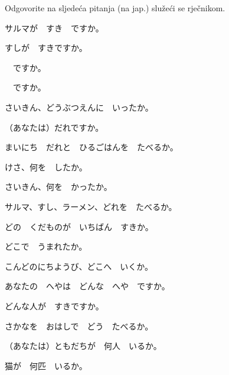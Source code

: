 
\author{Tomislav Mamić}

	
	\begin{mondai}{Odgovorite na sljedeća pitanja (na jap.) služeći se rječnikom.}
		\item サルマが　すき　ですか。
		\item すしが　すきですか。\vspace{5pt}
		\item {}　ですか。\vspace{5pt}
		\item {}　ですか。
		\item さいきん、どうぶつえんに　いったか。
		\item （あなたは）だれですか。
		\item まいにち　だれと　ひるごはんを　たべるか。
		\item けさ、何を　したか。
		\item さいきん、何を　かったか。
		\item サルマ、すし、ラーメン、どれを　たべるか。
		\item どの　くだものが　いちばん　すきか。
		\item どこで　うまれたか。
		\item こんどのにちようび、どこへ　いくか。
		\item あなたの　へやは　どんな　へや　ですか。
		\item どんな人が　すきですか。
		\item さかなを　おはしで　どう　たべるか。
		\item （あなたは）ともだちが　何人　いるか。
		\item 猫が　何匹　いるか。
	\end{mondai}
